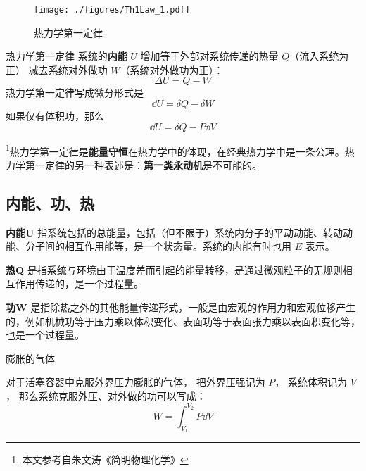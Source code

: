 
\begin{issues}
\issueDraft
\end{issues}


\begin{figure}[ht]
\centering
\texttt{[image: ./figures/Th1Law\_1.pdf]}
\caption{热力学第一定律} \label{Th1Law_fig1}
\end{figure}

\begin{theorem}{热力学第一定律}
系统的\textbf{内能} $U$ 增加等于外部对系统传递的热量 $Q$（流入系统为正） 减去系统对外做功 $W$（系统对外做功为正）：
\begin{equation}\label{Th1Law_eq1}
\Delta U = Q - W
\end{equation}
热力学第一定律写成微分形式是
\begin{equation} \label{Th1Law_eq2}
\dd U = \delta Q - \delta W
\end{equation}
如果仅有体积功，那么
\begin{equation}
\dd U = \delta Q - P \dd V
\end{equation}
\end{theorem}

\footnote{本文参考自朱文涛《简明物理化学》}热力学第一定律是\textbf{能量守恒}在热力学中的体现，在经典热力学中是一条公理。热力学第一定律的另一种表述是：\textbf{第一类永动机}是不可能的。

\subsection{内能、功、热}
\textbf{内能U} 指系统包括的总能量，包括（但不限于）系统内分子的平动动能、转动动能、分子间的相互作用能等，是一个状态量。系统的内能有时也用 $E$ 表示。 

\textbf{热Q} 是指系统与环境由于温度差而引起的能量转移，是通过微观粒子的无规则相互作用传递的，是一个过程量。

\textbf{功W} 是指除热之外的其他能量传递形式，一般是由宏观的作用力和宏观位移产生的，例如机械功等于压力乘以体积变化、表面功等于表面张力乘以表面积变化等，也是一个过程量。

\begin{example}{膨胀的气体}

对于活塞容器中克服外界压力膨胀的气体， 把外界压强记为 $P$， 系统体积记为 $V$， 那么系统克服外压、对外做的功可以写成：
\begin{equation}
W = \int_{V_1}^{V_2} P \dd{V}
\end{equation}
\end{example}

